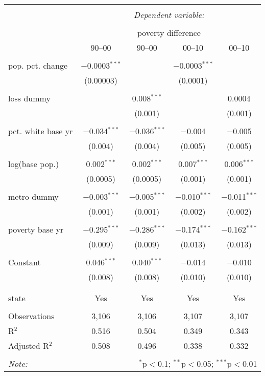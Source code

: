 \documentclass{standalone}
\begin{document}
\begin{tabular}{@{\extracolsep{5pt}}lcccc} 
\\[-1.8ex]\hline 
\hline \\[-1.8ex] 
 & \multicolumn{4}{c}{\textit{Dependent variable:}} \\ 
\cline{2-5} 
\\[-1.8ex] & \multicolumn{4}{c}{poverty difference} \\ 
 & 90--00 & 90--00 & 00--10 & 00--10 \\ 
\hline \\[-1.8ex] 
 pop. pct. change & $-$0.0003$^{***}$ &  & $-$0.0003$^{***}$ &  \\ 
  & (0.00003) &  & (0.0001) &  \\ 
  & & & & \\ 
 loss dummy &  & 0.008$^{***}$ &  & 0.0004 \\ 
  &  & (0.001) &  & (0.001) \\ 
  & & & & \\ 
 pct. white base yr & $-$0.034$^{***}$ & $-$0.036$^{***}$ & $-$0.004 & $-$0.005 \\ 
  & (0.004) & (0.004) & (0.005) & (0.005) \\ 
  & & & & \\ 
 log(base pop.) & 0.002$^{***}$ & 0.002$^{***}$ & 0.007$^{***}$ & 0.006$^{***}$ \\ 
  & (0.0005) & (0.0005) & (0.001) & (0.001) \\ 
  & & & & \\ 
 metro dummy & $-$0.003$^{***}$ & $-$0.005$^{***}$ & $-$0.010$^{***}$ & $-$0.011$^{***}$ \\ 
  & (0.001) & (0.001) & (0.002) & (0.002) \\ 
  & & & & \\ 
 poverty base yr & $-$0.295$^{***}$ & $-$0.286$^{***}$ & $-$0.174$^{***}$ & $-$0.162$^{***}$ \\ 
  & (0.009) & (0.009) & (0.013) & (0.013) \\ 
  & & & & \\ 
 Constant & 0.046$^{***}$ & 0.040$^{***}$ & $-$0.014 & $-$0.010 \\ 
  & (0.008) & (0.008) & (0.010) & (0.010) \\ 
  & & & & \\ 
\hline \\[-1.8ex] 
state & Yes & Yes & Yes & Yes \\ 
\hline \\[-1.8ex] 
Observations & 3,106 & 3,106 & 3,107 & 3,107 \\ 
R$^{2}$ & 0.516 & 0.504 & 0.349 & 0.343 \\ 
Adjusted R$^{2}$ & 0.508 & 0.496 & 0.338 & 0.332 \\ 
\hline 
\hline \\[-1.8ex] 
\textit{Note:}  & \multicolumn{4}{r}{$^{*}$p$<$0.1; $^{**}$p$<$0.05; $^{***}$p$<$0.01} \\ 
\end{tabular} 
\end{document}
